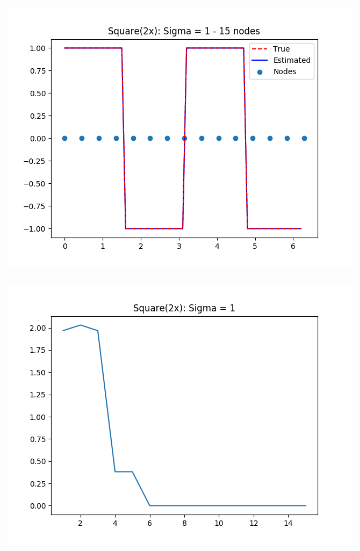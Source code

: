 \documentclass{article}
\begin{document}
\begin{figure}[ht!]
    \centering
    \begin{subfigure}[t]{0.4\textwidth}
        \centering
        \includegraphics[width=1\textwidth]{plots/batch/best_square_cheat.png}
        \caption{}
    \end{subfigure}
    \begin{subfigure}[t]{0.4\textwidth}
        \centering
        \includegraphics[width=1\textwidth]{plots/batch/square_error_sign}
        \caption{}
    \end{subfigure}
\end{figure}
\end{document}
